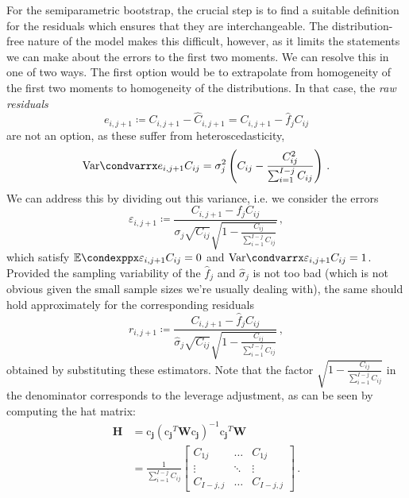 \documentclass[a4paper]{book}
\begin{document}
For the semiparametric bootstrap, the crucial step is to find a suitable definition for the residuals which ensures that they are interchangeable. The distribution-free nature of the model makes this difficult, however, as it limits the statements we can make about the errors to the first two moments. We can resolve this in one of two ways. The first option would be to extrapolate from homogeneity of the first two moments to homogeneity of the distributions. In that case, the \emph{raw residuals}
\begin{equation}
  e_{i, j + 1} \coloneqq C_{i, j + 1} - \widehat{C}_{i, j + 1} = C_{i, j + 1} - \widehat{f}_j C_{ij}
\end{equation}
are not an option, as these suffer from heteroscedasticity,
\begin{equation}
  \condvarr{e_{i, j + 1}}{C_{ij}} = \sigma^2_j \left( C_{ij} - \frac{C^2_{ij}}{\sum_{i = 1}^{I - j} C_{ij}} \right) \,.
\end{equation}
We can address this by dividing out this variance, i.e. we consider the errors
\begin{equation}
  \varepsilon_{i, j + 1} \coloneqq \frac{C_{i, j + 1} - f_j C_{ij}}{\sigma_j \sqrt{C_{ij}} \sqrt{1 - \frac{C_{ij}}{\sum_{i = 1}^{I - j} C_{ij}}}} \,,
\end{equation}
which satisfy $\condexpp{\varepsilon_{i, j + 1}}{C_{ij}} = 0$ and $\condvarr{\varepsilon_{i, j + 1}}{C_{ij}} = 1$. Provided the sampling variability of the $\widehat{f}_j$ and $\widehat{\sigma}_j$ is not too bad (which is not obvious given the small sample sizes we're usually dealing with), the same should hold approximately for the corresponding residuals
\begin{equation}
  r_{i, j + 1} \coloneqq \frac{C_{i, j + 1} - \widehat{f}_j C_{ij}}{\widehat{\sigma}_j \sqrt{C_{ij}} \sqrt{1 - \frac{C_{ij}}{\sum_{i = 1}^{I - j} C_{ij}}}} \,,
\end{equation}
obtained by substituting these estimators. Note that the factor $\sqrt{1 - \frac{C_{ij}}{\sum_{i = 1}^{I - j} C_{ij}}}$ in the denominator corresponds to the leverage adjustment, as can be seen by computing the hat matrix:
\begin{align}
  \mathbf{H} &= \bm{\mathrm{c}_j} (\bm{\mathrm{c}_j}^T \mathbf{W} \bm{\mathrm{c}_j})^{-1} \bm{\mathrm{c}_j}^T \mathbf{W} \\[4pt]
  &= \frac{1}{\sum_{i = 1}^{I - j} C_{ij}}
  \begin{bmatrix}
    C_{1j} & \dots & C_{1j} \\
    \vdots & \ddots & \vdots\\
    C_{I - j, j} & \dots & C_{I - j, j}
  \end{bmatrix} \,.
\end{align}
\end{document}
